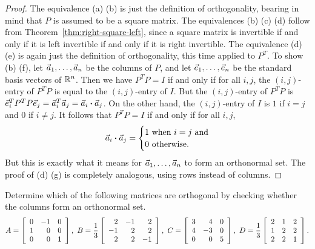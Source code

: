 \documentclass{ximera}
\begin{document}
\begin{proof}
  The equivalence (a) {\textiff} (b) is just the definition of
  orthogonality, bearing in mind that $P$ is assumed to be a square
  matrix. The equivalences (b) {\textiff} (c) {\textiff} (d) follow
  from Theorem~\ref{thm:right-square-left}, since a square matrix is
  invertible if and only if it is left invertible if and only if it is
  right invertible.  The equivalence (d) {\textiff} (e) is again just
  the definition of orthogonality, this time applied to $P^T$. To show
  (b) {\textiff} (f), let $\vect{a}_1,\ldots,\vect{a}_n$ be the
  columns of $P$, and let $\vect{e}_1,\ldots,\vect{e}_n$ be the
  standard basis vectors of $\R^n$. Then we have $P^TP = I$ if and
  only if for all $i,j$, the $(i,j)$-entry of $P^TP$ is equal to the
  $(i,j)$-entry of $I$.  But the $(i,j)$-entry of $P^TP$ is
  $\vect{e}_i^TP^TP\vect{e}_j = \vect{a}_i^T\vect{a}_j =
  \vect{a}_i\dotprod\vect{a}_j$. On the other hand, the $(i,j)$-entry
  of $I$ is $1$ if $i=j$ and $0$ if $i\neq j$. It follows that
  $P^TP=I$ if and only if for all $i,j$,
  \begin{equation*}
    \vect{a}_i\dotprod\vect{a}_j=\begin{cases}
      1 & \mbox{when $i=j$ and} \\
      0 & \mbox{otherwise}.
    \end{cases}
  \end{equation*}
  But this is exactly what it means for $\vect{a}_1,\ldots,\vect{a}_n$
  to form an orthonormal set.
  The proof of (d) {\textiff} (g) is completely analogous, using rows
  instead of columns.
\end{proof}

\begin{example}\label{ex:conditions-orthogonal-matrix}
  Determine which of the following matrices are orthogonal by checking
  whether the columns form an orthonormal set.
  \begin{equation*}
    A = \startmat{rrr}
      0 & -1 & 0 \\
      1 & 0 & 0 \\
      0 & 0 & 1 \\
    \stopmat,
    \quad
    B = \frac{1}{3}
    \startmat{rrr}
      2  & -1 &  2 \\
      -1 &  2 &  2 \\
      2  &  2 & -1 \\
    \stopmat,
    \quad
    C =
    \startmat{rrr}
      3 &  4 & 0 \\
      4 & -3 & 0 \\
      0 &  0 & 5 \\
    \stopmat,
    \quad
    D = \frac{1}{3}
    \startmat{rrr}
      2  &  1 &  2 \\
      1  &  2 &  2 \\
      2  &  2 &  1 \\
    \stopmat.
  \end{equation*}
\end{example}
\end{document}
